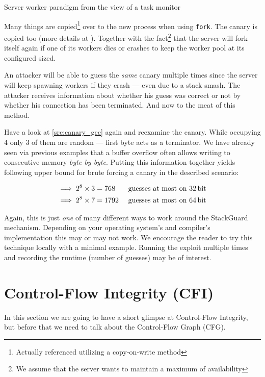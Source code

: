 \documentclass[article]{uibk}
\begin{document}
\begin{listing}[h!]
    \caption{Server worker paradigm from the view of a task monitor}
    \label{src:server_worker}
\end{listing}

Many things are copied\footnote{Actually referenced utilizing a copy-on-write
method} over to the new process when using \texttt{fork}. The canary is copied
too (more details at \cite{phrack_stack_guard2}). Together with the
fact\footnote{We assume that the server wants to maintain a maximum of
availability} that the server will fork itself again if one of its workers dies
or crashes to keep the worker pool at its configured sized.

An attacker will be able to guess the \emph{same} canary multiple times since
the server will keep spawning workers if they crash --- even due to a stack
smash. The attacker receives information about whether his guess was correct or
not by whether his connection has been terminated. And now to the meat of this
method.

Have a look at \cref{src:canary_gcc} again and reexamine the canary. While
occupying \SI{4}{\byte} only 3 of them are random --- first byte acts as a
terminator. We have already seen via previous examples that a buffer overflow
often allows writing to consecutive memory \emph{byte by byte}. Putting this
information together yields following upper bound for brute forcing a canary in
the described scenario:

\begin{align*}
    \implies 2^8 \times 3 & = 768  & \text{ guesses at most on \SI{32}{\bit}}\\
    \implies 2^8 \times 7 & = 1792 & \text{ guesses at most on \SI{64}{\bit}}
\end{align*}

Again, this is just \emph{one} of many different ways to work around the
StackGuard mechanism. Depending on your operating system's and compiler's
implementation this may or may not work. We encourage the reader to try this
technique locally with a minimal example. Running the exploit multiple times
and recording the runtime (number of guesses) may be of interest.

\section{Control-Flow Integrity (CFI)}

In this section we are going to have a short glimpse at Control-Flow Integrity,
but before that we need to talk about the Control-Flow Graph (CFG).
\end{document}
